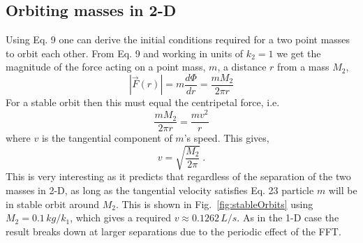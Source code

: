 \documentclass[10pt,a4paper]{article}
\begin{document}
\subsection{Orbiting masses in 2-D}
Using Eq. 9 one can derive the initial conditions required for a two point masses to orbit each other. From Eq. 9 and working in units of $k_2=1$ we get the magnitude of the force acting on a point mass, $m$, a distance $r$ from a mass $M_2$,
\begin{equation}
|\vec{F}(r)| = m\frac{d\Phi}{dr} = \frac{mM_2}{2\pi r}
\end{equation}
For a stable orbit then this must equal the centripetal force, i.e.
\begin{equation}
\frac{mM_2}{2\pi r} = \frac{mv^2}{r}
\end{equation}
where $v$ is the tangential component of $m$'s speed. This gives,
\begin{equation}
v = \sqrt{\frac{M_2}{2\pi}}\:.
\end{equation}
This is very interesting as it predicts that regardless of the separation of the two masses in 2-D, as long as the tangential velocity satisfies Eq. 23 particle $m$ will be in stable orbit around $M_2$. This is shown in Fig.~\ref{fig:stableOrbits} using $M_2=0.1\, kg/k_1$, which gives a required $v\approx0.1262\,L/s$. As in the 1-D case the result breaks down at larger separations due to the periodic effect of the FFT.
\end{document}
